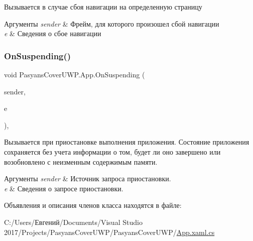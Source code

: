 Вызывается в случае сбоя навигации на определенную страницу 


\begin{DoxyParams}{Аргументы}
{\em sender} & Фрейм, для которого произошел сбой навигации\\
\hline
{\em e} & Сведения о сбое навигации\\
\hline
\end{DoxyParams}
\mbox{\label{class_pasyans_cover_u_w_p_1_1_app_ac6a96abb073dd70340b917f4e7ef9762}} 
\subsubsection{\texorpdfstring{On\+Suspending()}{OnSuspending()}}
{\footnotesize\ttfamily void Pasyans\+Cover\+U\+W\+P.\+App.\+On\+Suspending (\begin{DoxyParamCaption}\item[{object}]{sender,  }\item[{Suspending\+Event\+Args}]{e }\end{DoxyParamCaption})\hspace{0.3cm}{\ttfamily [inline]}, {\ttfamily [private]}}



Вызывается при приостановке выполнения приложения. Состояние приложения сохраняется без учета информации о том, будет ли оно завершено или возобновлено с неизменным содержимым памяти. 


\begin{DoxyParams}{Аргументы}
{\em sender} & Источник запроса приостановки.\\
\hline
{\em e} & Сведения о запросе приостановки.\\
\hline
\end{DoxyParams}


Объявления и описания членов класса находятся в файле\+:\begin{DoxyCompactItemize}
\item 
C\+:/\+Users/Евгений/\+Documents/\+Visual Studio 2017/\+Projects/\+Pasyans\+Cover\+U\+W\+P/\+Pasyans\+Cover\+U\+W\+P/\hyperlink{_app_8xaml_8cs}{App.\+xaml.\+cs}\end{DoxyCompactItemize}
